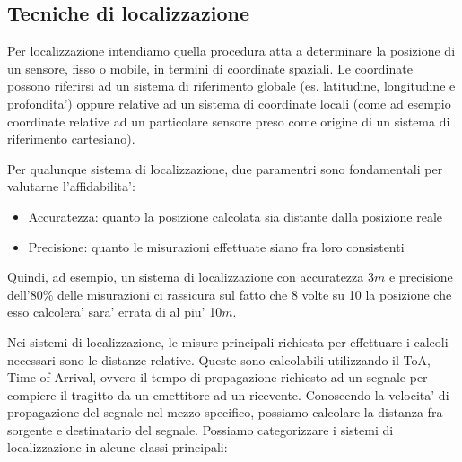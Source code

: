 \subsection{Tecniche di localizzazione}
Per localizzazione intendiamo quella procedura atta a determinare la posizione di un sensore, fisso o mobile, in termini di coordinate spaziali. Le coordinate possono riferirsi ad un sistema di riferimento globale (es. latitudine, longitudine e profondita') oppure relative ad un sistema di coordinate locali (come ad esempio coordinate relative ad un particolare sensore preso come origine di un sistema di riferimento cartesiano).
\par
Per qualunque sistema di localizzazione, due paramentri sono fondamentali per valutarne l'affidabilita':
\begin{itemize}
    \item Accuratezza: quanto la posizione calcolata sia distante dalla posizione reale
    \item Precisione: quanto le misurazioni effettuate siano fra loro consistenti
\end{itemize}
Quindi, ad esempio, un sistema di localizzazione con accuratezza 3$m$  e precisione dell'80\% delle misurazioni ci rassicura sul fatto che 8 volte su 10 la posizione che esso calcolera' sara' errata di al piu' 10$m$.
\par
Nei sistemi di localizzazione, le misure principali richiesta per effettuare i calcoli necessari sono le distanze relative. Queste sono calcolabili utilizzando il ToA, Time-of-Arrival, ovvero il tempo di propagazione richiesto ad un segnale per compiere il tragitto da un emettitore ad un ricevente. Conoscendo la velocita' di propagazione del segnale nel mezzo specifico, possiamo calcolare la distanza fra sorgente e destinatario del segnale.
Possiamo categorizzare i sistemi di localizzazione in alcune classi principali:
